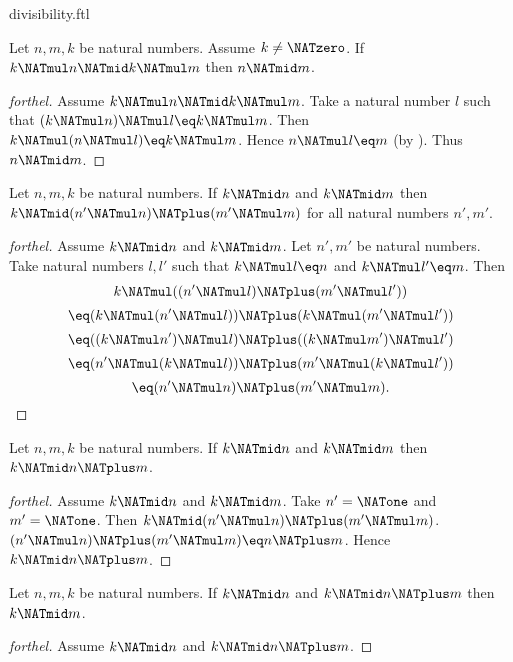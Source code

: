 \documentclass{naproche-library}
\begin{document}
\begin{smodule}[title=Divisibility]{divisibility.ftl}
\begin{proposition}[forthel,id=ARITHMETIC_07_6469492028735488]
  Let $n, m, k$ be natural numbers.
  Assume $k \neq \NATzero$.
  If $k \NATmul n \NATmid k \NATmul m$ then $n \NATmid m$.
\end{proposition}
\begin{proof}[forthel]
  Assume $k \NATmul n \NATmid k \NATmul m$.
  Take a natural number $l$ such that $(k \NATmul n) \NATmul l \eq k \NATmul m$.
  Then $k \NATmul (n \NATmul l) \eq k \NATmul m$.
  Hence $n \NATmul l \eq m$ (by ).
  Thus $n \NATmid m$.
\end{proof}

\begin{proposition}[forthel,id=ARITHMETIC_07_4700711333920768]
  Let $n, m, k$ be natural numbers.
  If $k \NATmid n$ and $k \NATmid m$ then $k \NATmid (n' \NATmul n) \NATplus (m' \NATmul m)$
  for all natural numbers $n', m'$.
\end{proposition}
\begin{proof}[forthel]
  Assume $k \NATmid n$ and $k \NATmid m$.
  Let $n', m'$ be natural numbers.
  Take natural numbers $l,l'$ such that $k \NATmul l \eq n$ and $k \NATmul l' \eq m$.
  Then
  \[  k \NATmul ((n' \NATmul l) \NATplus (m' \NATmul l'))                \]
  \[    \eq (k \NATmul (n' \NATmul l)) \NATplus (k \NATmul (m' \NATmul l'))  \]
  \[    \eq ((k \NATmul n') \NATmul l) \NATplus ((k \NATmul m') \NATmul l')  \]
  \[    \eq (n' \NATmul (k \NATmul l)) \NATplus (m' \NATmul (k \NATmul l'))  \]
  \[    \eq (n' \NATmul n) \NATplus (m' \NATmul m).                      \]
\end{proof}

\begin{corollary}[forthel,id=ARITHMETIC_07_1556786209357824]
  Let $n, m, k$ be natural numbers.
  If $k \NATmid n$ and $k \NATmid m$ then $k \NATmid n \NATplus m$.
\end{corollary}
\begin{proof}[forthel]
  Assume $k \NATmid n$ and $k \NATmid m$.
  Take $n' = \NATone$ and $m' = \NATone$.
  Then $k \NATmid (n' \NATmul n) \NATplus (m' \NATmul m)$.
  $(n' \NATmul n) \NATplus (m' \NATmul m) \eq n \NATplus m$.
  Hence $k \NATmid n \NATplus m$.
\end{proof}

\begin{proposition}[forthel,id=ARITHMETIC_07_1076947887063040]
  Let $n, m, k$ be natural numbers.
  If $k \NATmid n$ and $k \NATmid n \NATplus m$ then $k \NATmid m$.
\end{proposition}
\begin{proof}[forthel]
  Assume $k \NATmid n$ and $k \NATmid n \NATplus m$.


\end{proof}
\end{smodule}
\end{document}

